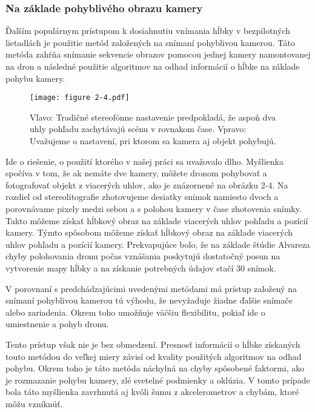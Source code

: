 \subsubsection{Na základe pohyblivého obrazu kamery}
Ďalším populárnym prístupom k dosiahnutiu vnímania hĺbky v bezpilotných lietadlách je použitie metód založených na snímaní pohyblivou kamerou. Táto metóda zahŕňa snímanie sekvencie obrazov pomocou jednej kamery namontovanej na dron a následné použitie algoritmov na odhad informácií o hĺbke na základe pohybu kamery.

\begin{figure}[ht!]
    \centering
    \texttt{[image: figure 2-4.pdf]}
    \caption{Vľavo: Tradičné stereofónne nastavenie predpokladá, že aspoň dva uhly pohľadu zachytávajú scénu v rovnakom čase. Vpravo: Uvažujeme o nastavení, pri ktorom sa kamera aj objekt pohybujú.}
    \label{o:2-4}
\end{figure}

Ide o riešenie, o použití ktorého v našej práci sa uvažovalo dlho. Myšlienka spočíva v tom, že ak nemáte dve kamery, môžete dronom pohybovať a fotografovať objekt z viacerých uhlov, ako je znázornené na obrázku 2-4. Na rozdiel od stereolitografie zhotovujeme desiatky snímok namiesto dvoch a porovnávame pixely medzi sebou a s polohou kamery v čase zhotovenia snímky. Takto môžeme získať hĺbkový obraz na základe viacerých uhlov pohľadu a pozícií kamery. Týmto spôsobom môžeme získať hĺbkový obraz na základe viacerých uhlov pohľadu a pozícií kamery. 
Prekvapujúce bolo, že na základe štúdie Alvareza \citep{alvarez2016collision} chyby polohovania dronu počas vznášania poskytujú dostatočný posun na vytvorenie mapy hĺbky a na získanie potrebných údajov stačí 30 snímok. 

V porovnaní s predchádzajúcimi uvedenými metódami má prístup založený na snímaní pohyblivou kamerou tú výhodu, že nevyžaduje žiadne ďalšie snímače alebo zariadenia. Okrem toho umožňuje väčšiu flexibilitu, pokiaľ ide o umiestnenie a pohyb dronu.

Tento prístup však nie je bez obmedzení. Presnosť informácií o hĺbke získaných touto metódou do veľkej miery závisí od kvality použitých algoritmov na odhad pohybu. Okrem toho je táto metóda náchylná na chyby spôsobené faktormi, ako je rozmazanie pohybu kamery, zlé svetelné podmienky a oklúzia. V tomto
prípade bola táto myšlienka zavrhnutá aj kvôli šumu z akcelerometrov a chybám,
ktoré môžu vzniknúť.

